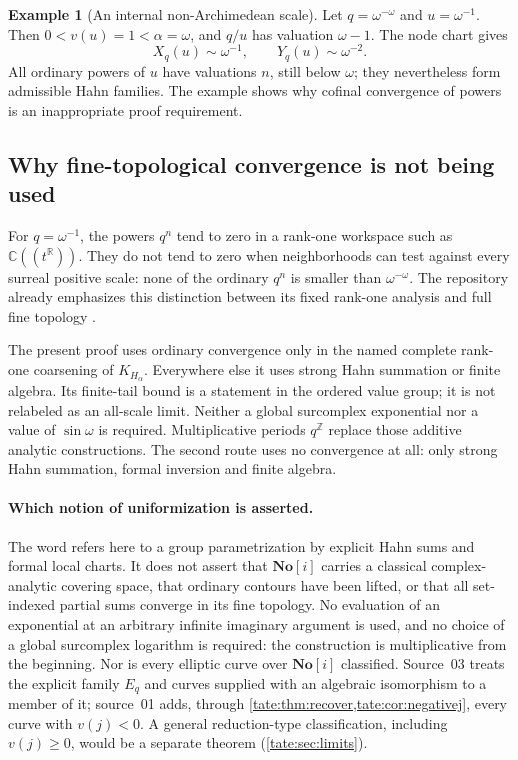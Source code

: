 \documentclass[11pt,letterpaper]{article}
\theoremstyle{definition}
\newtheorem{example}[example]{Example}
\newcommand{\C}{\mathbb C}
\newcommand{\R}{\mathbb R}
\newcommand{\Z}{\mathbb Z}
\newcommand{\No}{\mathbf{No}}
\begin{document}
\begin{example}[An internal non-Archimedean scale]\label{tate:node:ex:inner}
Let $q=\omega^{-\omega}$ and $u=\omega^{-1}$. Then
$0<v(u)=1<\alpha=\omega$, and $q/u$ has valuation $\omega-1$. The node
chart gives
\[
 X_q(u)\sim\omega^{-1},\qquad Y_q(u)\sim\omega^{-2}.
\]
All ordinary powers of $u$ have valuations $n$, still below $\omega$; they
nevertheless form admissible Hahn families. The example shows why cofinal
convergence of powers is an inappropriate proof requirement.
\end{example}

\subsection{Why fine-topological convergence is not being used}

For $q=\omega^{-1}$, the powers $q^n$ tend to zero in a rank-one
workspace such as $\C((t^\R))$. They do not tend to zero when neighborhoods
can test against every surreal positive scale: none of the ordinary
$q^n$ is smaller than $\omega^{-\omega}$. The repository already
emphasizes this distinction between its fixed rank-one analysis and
full fine topology \cite{RepoRankOne}.

The present proof uses ordinary convergence only in the named complete
rank-one coarsening of $K_{H_\alpha}$. Everywhere else it uses strong
Hahn summation or finite algebra. Its finite-tail bound is a statement
in the ordered value group; it is not relabeled as an all-scale limit.
Neither a global surcomplex exponential nor a value of $\sin\omega$
is required. Multiplicative periods $q^\Z$ replace those additive
analytic constructions. The second route uses no convergence at all: only
strong Hahn summation, formal inversion and finite algebra.

\paragraph{Which notion of uniformization is asserted.}
The word refers here to a group parametrization by explicit Hahn sums and
formal local charts. It does not assert that $\No[i]$ carries a classical
complex-analytic covering space, that ordinary contours have been lifted,
or that all set-indexed partial sums converge in its fine topology. No
evaluation of an exponential at an arbitrary infinite imaginary argument is
used, and no choice of a global surcomplex logarithm is required: the
construction is multiplicative from the beginning. Nor is every elliptic
curve over $\No[i]$ classified. Source~03 treats the explicit family $E_q$
and curves supplied with an algebraic isomorphism to a member of it;
source~01 adds, through \cref{tate:thm:recover,tate:cor:negativej}, every
curve with $v(j)<0$. A general reduction-type classification, including
$v(j)\ge0$, would be a separate theorem (\cref{tate:sec:limits}).
\end{document}
